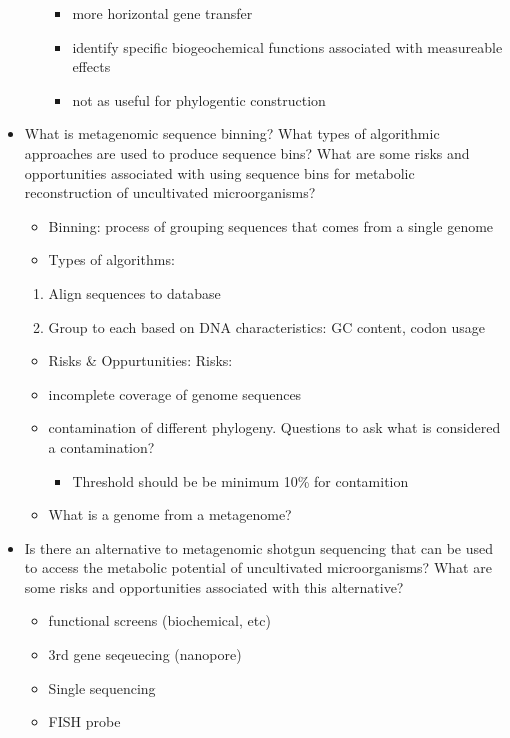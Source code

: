 \documentclass[]{article}
\providecommand{\tightlist}{%
  \setlength{\itemsep}{0pt}\setlength{\parskip}{0pt}}
\begin{document}
\begin{itemize}
\begin{itemize}
    \begin{itemize}
    \tightlist
    \item
      more horizontal gene transfer
    \item
      identify specific biogeochemical functions associated with
      measureable effects
    \item
      not as useful for phylogentic construction
    \end{itemize}
  \end{itemize}
\item
  What is metagenomic sequence binning? What types of algorithmic
  approaches are used to produce sequence bins? What are some risks and
  opportunities associated with using sequence bins for metabolic
  reconstruction of uncultivated microorganisms?

  \begin{itemize}
  \item
    Binning: process of grouping sequences that comes from a single
    genome
  \item
    Types of algorithms:
  \end{itemize}

  \begin{enumerate}
  \def\labelenumi{\arabic{enumi}.}
  \tightlist
  \item
    Align sequences to database
  \item
    Group to each based on DNA characteristics: GC content, codon usage
  \end{enumerate}

  \begin{itemize}
  \tightlist
  \item
    Risks \& Oppurtunities: Risks:
  \item
    incomplete coverage of genome sequences
  \item
    contamination of different phylogeny. Questions to ask what is
    considered a contamination?

    \begin{itemize}
    \tightlist
    \item
      Threshold should be be minimum 10\% for contamition
    \end{itemize}
  \item
    What is a genome from a metagenome?
  \end{itemize}
\item
  Is there an alternative to metagenomic shotgun sequencing that can be
  used to access the metabolic potential of uncultivated microorganisms?
  What are some risks and opportunities associated with this
  alternative?

  \begin{itemize}
  \tightlist
  \item
    functional screens (biochemical, etc)
  \item
    3rd gene seqeuecing (nanopore)
  \item
    Single sequencing
  \item
    FISH probe
  \end{itemize}
\end{itemize}
\end{document}
